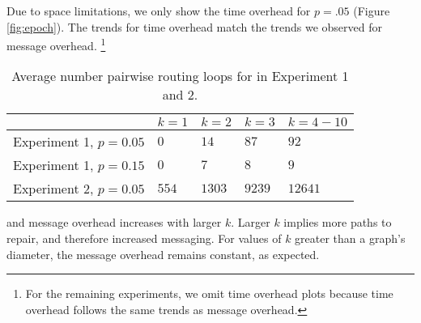 Due to space limitations, we only show the time overhead for $p=.05$ (Figure \ref{fig:epoch}). The trends for time overhead match the trends we observed for message overhead. 
{\footnote {\small For the remaining experiments, we omit time overhead plots because time overhead follows the same trends as message overhead.}}

\begin{table}
\begin{center}
\begin{tabular}{l|l|l|l|l}
 & $k=1$&  $k=2$ & $k=3$ & $k=4-10$ \\
\hline
 Experiment 1, $p=0.05$  & $0$ & $14$ & $87$ &  $92$ \\
 Experiment 1, $p=0.15$  & $0$ & $7$&  $8$ & $9$ \\
 Experiment 2, $p=0.05$  & $554$ & $1303$ & $9239$ &  $12641$ \\
\end{tabular}
\end{center}
\caption{Average number pairwise routing loops for \second in Experiment 1 and 2.}
\label{tab:loop1}
\end{table}


\purge and \second message overhead increases with larger $k$. Larger $k$ implies more paths to repair, and therefore increased messaging.
For values of $k$ greater than a graph's diameter, the message overhead remains constant, as expected. 



